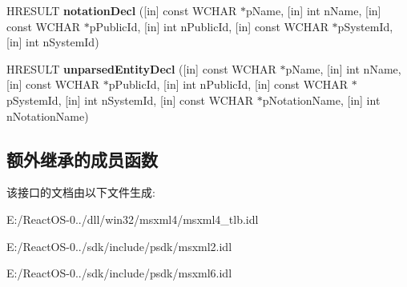 \begin{DoxyCompactItemize}
\item 
\mbox{\label{interface_m_s_x_m_l2_1_1_i_s_a_x_d_t_d_handler_ae48a68c286c4b0e4908ca675754de28f}} 
H\+R\+E\+S\+U\+LT {\bfseries notation\+Decl} (\mbox{[}in\mbox{]} const W\+C\+H\+AR $\ast$p\+Name, \mbox{[}in\mbox{]} int n\+Name, \mbox{[}in\mbox{]} const W\+C\+H\+AR $\ast$p\+Public\+Id, \mbox{[}in\mbox{]} int n\+Public\+Id, \mbox{[}in\mbox{]} const W\+C\+H\+AR $\ast$p\+System\+Id, \mbox{[}in\mbox{]} int n\+System\+Id)
\item 
\mbox{\label{interface_m_s_x_m_l2_1_1_i_s_a_x_d_t_d_handler_a2b7db6cf82828f2baabdbf85fde935d4}} 
H\+R\+E\+S\+U\+LT {\bfseries unparsed\+Entity\+Decl} (\mbox{[}in\mbox{]} const W\+C\+H\+AR $\ast$p\+Name, \mbox{[}in\mbox{]} int n\+Name, \mbox{[}in\mbox{]} const W\+C\+H\+AR $\ast$p\+Public\+Id, \mbox{[}in\mbox{]} int n\+Public\+Id, \mbox{[}in\mbox{]} const W\+C\+H\+AR $\ast$p\+System\+Id, \mbox{[}in\mbox{]} int n\+System\+Id, \mbox{[}in\mbox{]} const W\+C\+H\+AR $\ast$p\+Notation\+Name, \mbox{[}in\mbox{]} int n\+Notation\+Name)
\end{DoxyCompactItemize}
\subsection*{额外继承的成员函数}


该接口的文档由以下文件生成\+:\begin{DoxyCompactItemize}
\item 
E\+:/\+React\+O\+S-\/0../dll/win32/msxml4/msxml4\+\_\+tlb.\+idl\item 
E\+:/\+React\+O\+S-\/0../sdk/include/psdk/msxml2.\+idl\item 
E\+:/\+React\+O\+S-\/0../sdk/include/psdk/msxml6.\+idl\end{DoxyCompactItemize}
